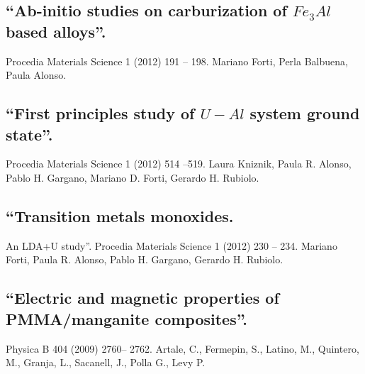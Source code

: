 \subsection{“Ab-initio studies on carburization of $Fe_3 Al$ based alloys”. } Procedia Materials Science 1 (2012) 191 – 198. Mariano Forti, Perla Balbuena, Paula Alonso.

 \subsection{“First principles study of $U-Al$ system ground state”. } Procedia Materials Science 1 (2012) 514 –519. Laura Kniznik, Paula R. Alonso, Pablo H. Gargano, Mariano D. Forti, Gerardo H. Rubiolo.

\subsection{“Transition metals monoxides. } An LDA+U study”. Procedia Materials Science 1 (2012) 230 – 234. Mariano Forti, Paula R. Alonso, Pablo H. Gargano, Gerardo H. Rubiolo.

\subsection{“Electric and magnetic properties of PMMA/manganite composites”. } Physica B 404 (2009) 2760– 2762. Artale, C., Fermepin, S., Latino, M., Quintero, M., Granja, L., Sacanell, J., Polla G., Levy P. 

